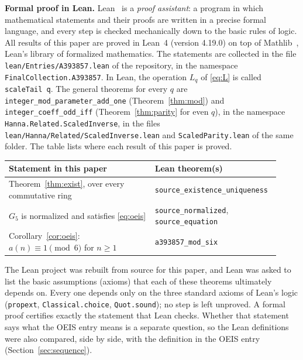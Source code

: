 \documentclass[11pt,a4paper]{article}
\theoremstyle{definition}
\theoremstyle{remark}
\newcommand{\para}[1]{\par\medskip\noindent\textbf{#1}\enspace}
\begin{document}
\para{Formal proof in Lean.}
Lean~\cite{lean} is a \emph{proof assistant}: a program in which mathematical statements and their proofs are written
in a precise formal language, and every step is checked mechanically down to the basic rules of logic. All results of
this paper are proved in Lean~4 (version 4.19.0) on top of Mathlib~\cite{mathlib}, Lean's library of formalized
mathematics. The statements are collected in the file \texttt{lean/Entries/A393857.lean} of the repository,
in the namespace \texttt{FinalCollection.A393857}. In Lean, the operation $L_q$ of \eqref{eq:L} is called \texttt{scaleTail q}. The general theorems for every $q$ are \texttt{integer\_mod\_parameter\_add\_one} (Theorem~\ref{thm:mod}) and \texttt{integer\_coeff\_odd\_iff} (Theorem~\ref{thm:parity} for even $q$), in the namespace \texttt{Hanna.\allowbreak Related.\allowbreak ScaledInverse}, in the files \texttt{lean/\allowbreak Hanna/\allowbreak Related/\allowbreak ScaledInverse.lean} and \texttt{ScaledParity.lean} of the same folder.
The table lists where each result of this paper is proved.
\begin{center}\small\renewcommand{\arraystretch}{1.25}
\begin{tabular}{>{\raggedright\arraybackslash}p{0.52\linewidth}>{\raggedright\arraybackslash}p{0.4\linewidth}}
\toprule
Statement in this paper & Lean theorem(s)\\
\midrule
Theorem~\ref{thm:exist}, over every commutative ring & \texttt{source\_\allowbreak{}existence\_\allowbreak{}uniqueness} \\
$G_{5}$ is normalized and satisfies \eqref{eq:oeis} & \texttt{source\_\allowbreak{}normalized}, \texttt{source\_\allowbreak{}equation} \\
Corollary~\ref{cor:oeis}: $a(n)\equiv1\pmod{6}$ for $n\ge1$ & \texttt{a393857\_\allowbreak{}mod\_\allowbreak{}six} \\
\bottomrule
\end{tabular}
\end{center}
The Lean project was rebuilt from source for this paper, and Lean was asked to list the basic assumptions (axioms)
that each of these theorems ultimately depends on. Every one depends only on the three standard axioms of Lean's logic
(\texttt{propext}, \texttt{Classical.choice}, \texttt{Quot.sound}); no step is left unproved. A formal proof certifies
exactly the statement that Lean checks. Whether that statement says what the OEIS entry means is a separate question,
so the Lean definitions were also compared, side by side, with the definition in the OEIS entry
(Section~\ref{sec:sequence}).
\end{document}
